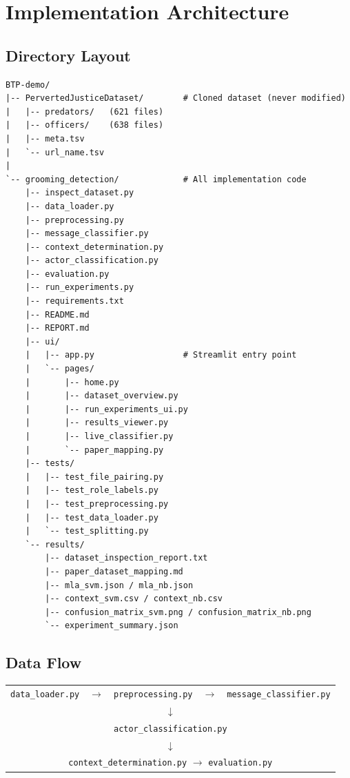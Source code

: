 \documentclass[12pt,a4paper]{article}
\begin{document}
\section{Implementation Architecture}

\subsection{Directory Layout}

\begin{lstlisting}
BTP-demo/
|-- PervertedJusticeDataset/        # Cloned dataset (never modified)
|   |-- predators/   (621 files)
|   |-- officers/    (638 files)
|   |-- meta.tsv
|   `-- url_name.tsv
|
`-- grooming_detection/             # All implementation code
    |-- inspect_dataset.py
    |-- data_loader.py
    |-- preprocessing.py
    |-- message_classifier.py
    |-- context_determination.py
    |-- actor_classification.py
    |-- evaluation.py
    |-- run_experiments.py
    |-- requirements.txt
    |-- README.md
    |-- REPORT.md
    |-- ui/
    |   |-- app.py                  # Streamlit entry point
    |   `-- pages/
    |       |-- home.py
    |       |-- dataset_overview.py
    |       |-- run_experiments_ui.py
    |       |-- results_viewer.py
    |       |-- live_classifier.py
    |       `-- paper_mapping.py
    |-- tests/
    |   |-- test_file_pairing.py
    |   |-- test_role_labels.py
    |   |-- test_preprocessing.py
    |   |-- test_data_loader.py
    |   `-- test_splitting.py
    `-- results/
        |-- dataset_inspection_report.txt
        |-- paper_dataset_mapping.md
        |-- mla_svm.json / mla_nb.json
        |-- context_svm.csv / context_nb.csv
        |-- confusion_matrix_svm.png / confusion_matrix_nb.png
        `-- experiment_summary.json
\end{lstlisting}

\subsection{Data Flow}

\begin{center}
\begin{tabular}{ccccc}
  \texttt{data\_loader.py}
  & $\longrightarrow$
  & \texttt{preprocessing.py}
  & $\longrightarrow$
  & \texttt{message\_classifier.py} \\
  \multicolumn{5}{c}{$\downarrow$} \\
  \multicolumn{5}{c}{\texttt{actor\_classification.py}} \\
  \multicolumn{5}{c}{$\downarrow$} \\
  \multicolumn{5}{c}{\texttt{context\_determination.py}
    $\longrightarrow$ \texttt{evaluation.py}} \\
\end{tabular}
\end{center}
\end{document}
